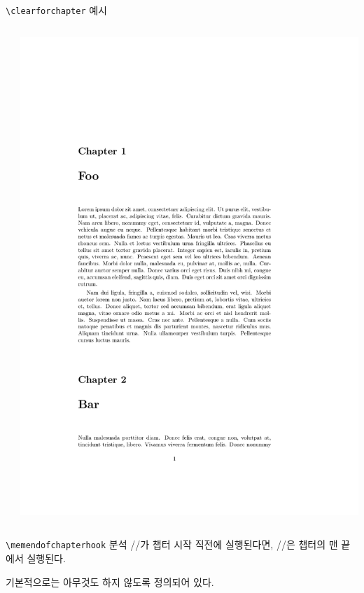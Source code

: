 \documentclass{beamer}
\def\tbs{\textbackslash}
\begin{document}
\begin{frame}[fragile]{\texttt{\tbs clearforchapter} 예시}
\begin{columns}
\begin{column}{0.4\textwidth}
    \end{column}
    \begin{column}{0.4\textwidth}
      \includegraphics[frame,page=2,width=\linewidth]{examples/clearforchapter}
    \end{column}
  \end{columns}
\end{frame}

\begin{frame}[fragile]{\texttt{\tbs memendofchapterhook} 분석}
  \ltxverb/\clearforchapter/가 챕터 시작 직전에 실행된다면,
  \ltxverb/\memendofchapterhook/은 챕터의 맨 끝에서 실행된다.

  기본적으로는 아무것도 하지 않도록 정의되어 있다.
\end{frame}
\end{document}
